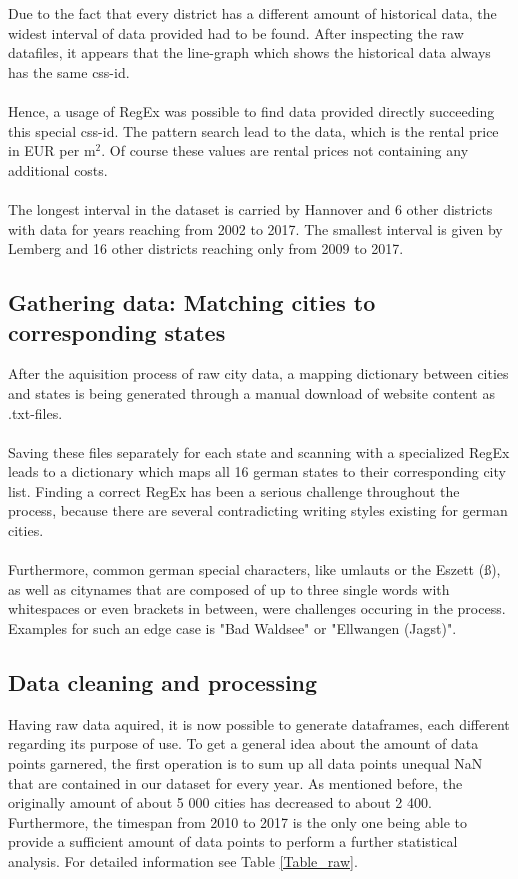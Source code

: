 \documentclass{article}
\begin{document}
	Due to the fact that every district has a different amount of historical data, the widest interval of data provided had to be found. After inspecting the raw datafiles, it appears that the line-graph which shows the historical data always has the same css-id. \\\\
	Hence, a usage of RegEx was possible to find data provided directly succeeding this special css-id. The pattern search lead to the data, which is the rental price in EUR per $\mathrm{m^2}$. Of course these values are rental prices not containing any additional costs.\\\\
	The longest interval in the dataset is carried by Hannover and 6 other districts with data for years reaching from 2002 to 2017. The smallest interval is given by Lemberg and 16 other districts reaching only from 2009 to 2017.

\subsection{Gathering data: Matching cities to corresponding states}
	After the aquisition process of raw city data, a mapping dictionary between cities and states is being generated through a manual download of website content as .txt-files. \cite{rental_prices_states}\\\\
	Saving these files separately for each state and scanning with a specialized RegEx leads to a dictionary which maps all 16 german states to their corresponding city list. Finding a correct RegEx has been a serious challenge throughout the process, because there are several contradicting writing styles existing for german cities. \\\\
	Furthermore, common german special characters, like umlauts or the Eszett (ß), as well as citynames that are composed of up to three single words with whitespaces or even brackets in between, were challenges occuring in the process. Examples for such an edge case is "Bad Waldsee" or "Ellwangen (Jagst)".

\subsection{Data cleaning and processing}
	Having raw data aquired, it is now possible to generate dataframes, each different regarding its purpose of use. To get a general idea about the amount of data points garnered, the first operation is to sum up all data points unequal NaN that are contained in our dataset for every year. As mentioned before, the originally amount of about 5 000 cities has decreased to about 2 400. Furthermore, the timespan  from 2010 to 2017 is the only one being able to provide a sufficient amount of data points to perform a further statistical analysis. For detailed information see Table \ref{Table_raw}.
\end{document}
